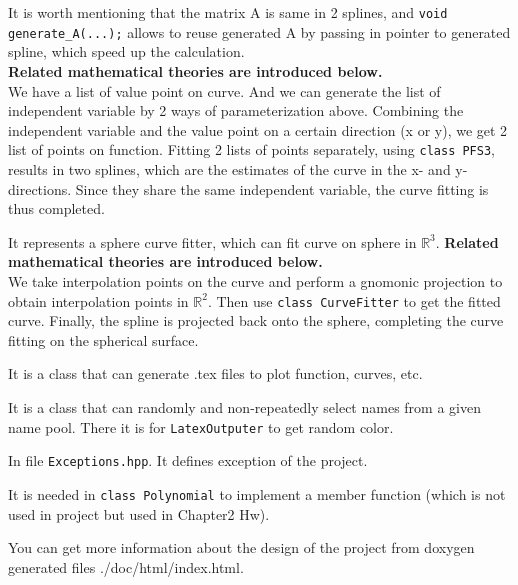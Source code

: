 \documentclass[a4paper]{article}
\begin{document}
\begin{description}
  It is worth mentioning that the matrix A is same in 2 splines, 
  and \texttt{void generate\_A(...);} allows to reuse generated A by passing in pointer to generated spline, 
  which speed up the calculation.\\
  \textbf{Related mathematical theories are introduced below.}\\
  We have a list of value point on curve. And we can generate the list of independent variable by 2 ways of parameterization above.
  Combining the independent variable and the value point on a certain direction (x or y), we get 2 list of points on function.
  Fitting 2 lists of points separately, using \texttt{class PFS3}, results in two splines, which are the estimates of the curve in the x- and y-directions. 
  Since they share the same independent variable, the curve fitting is thus completed.
  \item[SphereCurveFitter]
  It represents a sphere curve fitter, which can fit curve on sphere in \(\mathbb{R}^3\). \textbf{Related mathematical theories are introduced below.}\\
  We take interpolation points on the curve and perform a gnomonic projection to obtain interpolation points in $\mathbb{R}^2$. 
  Then use \texttt{class CurveFitter} to get the fitted curve. Finally, the spline is projected back onto the sphere, completing the curve fitting on the spherical surface.
  \item[LatexOutputer]
  It is a class that can generate .tex files to plot function, curves, etc.
  \item[NameLibrary]
  It is a class that can randomly and non-repeatedly select names from a given name pool. There it is for \texttt{LatexOutputer} to get random color.
  \item[...Exception]
  In file \texttt{Exceptions.hpp}. It defines exception of the project.
  \item[EquationSolver]
  It is needed in \texttt{class Polynomial} to implement a member function (which is not used in project but used in Chapter2 Hw).
\end{description}

You can get more information about the design of the project from doxygen generated files ./doc/html/index.html.
\end{document}
